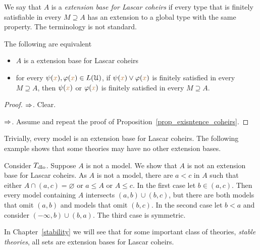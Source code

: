 We say that $A$ is a \emph{extension base for Lascar coheirs\/} if every type that is finitely satisfiable in every $M\supseteq A$ has an extension to a global type with the same property.
The terminology is not standard.

\begin{proposition}\label{prop_exisntence_coheirs_over_sets}
  The following are equivalent
  \begin{itemize}
    \item[1.] $A$ is a extension base for Lascar coheirs
    \item[2.] for every $\psi({\color{brown} x}),\varphi({\color{brown} x})\in L(\EuScript U)$, if $\psi({\color{brown} x})\vee\varphi({\color{brown} x})$ is finitely satisfied in every $M\supseteq A$, then $\psi({\color{brown} x})$ or $\varphi({\color{brown} x})$ is finitely satisfied in every $M\supseteq A$. 
  \end{itemize}  
\end{proposition}
  
\begin{proof} 
  $\Rightarrow$. Clear.
  
  $\Rightarrow$. Assume  and repeat the proof of Proposition~\ref{prop_exisntence_coheirs}.
\end{proof}
  
Trivially, every model is an extension base for Lascar coheirs.
The following example shows that some theories may have no other extension bases.

\begin{example}
  Consider $T_{\rm dlo}$.
  Suppose $A$ is not a model.
  We show that $A$ is not an extension base for Lascar coheirs.
  As $A$ is not a model, there are $a<c$ in $A$ such that either $A\cap(a,c)=\varnothing$ or $a\le A$ or $A\le c$.
  In the first case let $b\in(a,c)$. 
  Then every model containing $A$ intersects $(a,b)\cup (b,c)$, but there are both models that omit $(a,b)$ and models that omit $(b,c)$.
  In the second case let $b<a$ and consider $(-\infty,b)\cup (b,a)$.
  The third case is symmetric.
\end{example}

In Chapter~\ref{stability} we will see that for some important class of theories, \textit{stable theories}, all sets are extension bases for Lascar coheirs.

